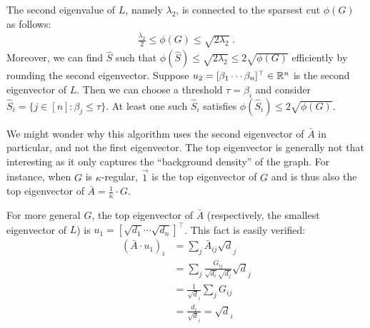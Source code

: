 \begin{theorem}
The second eigenvalue of $L$, namely $\lambda_2$, is connected to the sparsest cut $\phi(G)$ as follows:
\begin{align}
    \frac{\lambda_2}{2} \leq \phi(G) \leq \sqrt{2 \lambda_2} \;.
\end{align}
Moreover, we can find $\hat{S}$ such that $\phi(\hat{S}) \leq \sqrt{2 \lambda_2} \leq 2 \sqrt{\phi(G)}$ efficiently by rounding the second eigenvector. Suppose $u_2 = [\beta_1 \cdots \beta_n]^\top \in \mathbb R^n$ is the second eigenvector of $L$. Then we can choose a threshold $\tau = \beta_i$ and consider $\hat{S}_i = \{ j \in [n] : \beta_j \leq \tau \}$. At least one such $\hat{S}_i$ satisfies $\phi(\hat{S}_i) \leq 2 \sqrt{\phi(G)}$.
\end{theorem}

\begin{remark}
We might wonder why this algorithm uses the second eigenvector of $\bar{A}$ in particular, and not the first eigenvector. The top eigenvector is generally not that interesting as it only captures the ``background density'' of the graph. For instance, when $G$ is $\kappa$-regular, $\vec{1}$ is the top eigenvector of $G$ and is thus also the top eigenvector of $\bar{A} = \frac{1}{\kappa} \cdot G$. 

For more general $G$, the top eigenvector of $\bar{A}$ (respectively, the smallest eigenvector of $L$) is $u_1 = [\sqrt{d_1} \cdots \sqrt{d_n}]^\top$. This fact is easily verified:
\begin{align}
    (\bar{A} \cdot u_1)_i &= \sum_j \bar{A}_{ij} \sqrt{d}_j \\
    &= \sum_j \frac{G_{ij}}{\sqrt{d_i}\sqrt{d_j}} \sqrt{d}_j \\
    &= \frac{1}{\sqrt{d}_i} \sum_j G_{ij} \\
    &= \frac{d_i}{\sqrt{d}_i} = \sqrt{d}_i
\end{align}

\end{remark}

